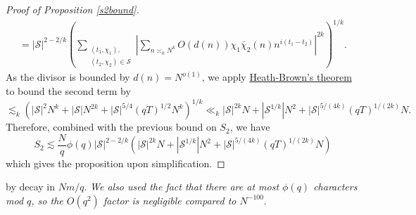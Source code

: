 \begin{proof}[Proof of Proposition \ref{s2bound}]
\begin{align*}
        =|\mathcal{S}|^{2-2/k}\left(\sum_{\substack{(t_1,\chi_1),\\(t_2,\chi_2)\in\mathcal{S}}} \left|\sum_{n\asymp_k N^k} O(d(n))\chi_1\bar\chi_2(n)n^{i(t_1-t_2)}\right|^{2k}\right)^{1/k}.
    \end{align*}
    As the divisor is bounded by $d(n)=N^{o(1)}$, we apply \hyperref[heathbrown]{Heath-Brown's theorem} to bound the second term by \[
    \lesssim_k (|\mathcal{S}|^2N^k+|\mathcal{S}|N^{2k}+|\mathcal{S}|^{5/4}(qT)^{1/2}N^k)^{1/k}\ll_k|\mathcal{S}|^{2k}N+|\mathcal{S}^{1/k}|N^{2}+|\mathcal{S}|^{5/(4k)}(qT)^{1/(2k)}N.
    \]
    Therefore, combined with the previous bound on $S_2$, we have \[
    S_2\lesssim \frac{N}{q} \phi(q)|\mathcal{S}|^{2-2/k}(|\mathcal{S}|^{2k}N+|\mathcal{S}^{1/k}|N^{2}+|\mathcal{S}|^{5/(4k)}(qT)^{1/(2k)}N)
    \]
    which gives the proposition upon simplification.
\end{proof}
 by decay in $Nm/q$. \textit{We also used the fact that there are at most $\phi(q)$ characters mod $q$, so the $O(q^2)$ factor is negligible compared to $N^{-100}$}.

